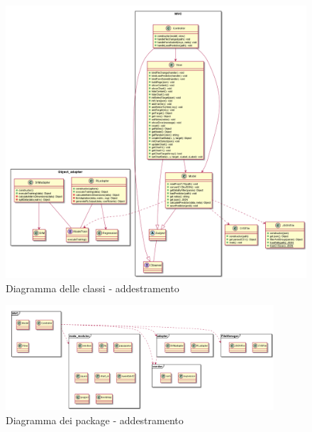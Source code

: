 \documentclass[../manuale-sviluppatore.tex]{subfiles}
\begin{document}
\begin{figure}[H]
   \begin{center}
        \includegraphics[width=14cm]{img/classDiagramTA.png}
        \caption{Diagramma delle classi - addestramento}
        \label{fig:diagramma_classi}
    \end{center}
\end{figure}

\begin{figure}[H]
    \begin{center}
         \includegraphics[width=10cm]{img/packagesDiagramTA.png}
         \caption{Diagramma dei package - addestramento}
         \label{fig:daa}
     \end{center}
 \end{figure}

 
\end{document}
